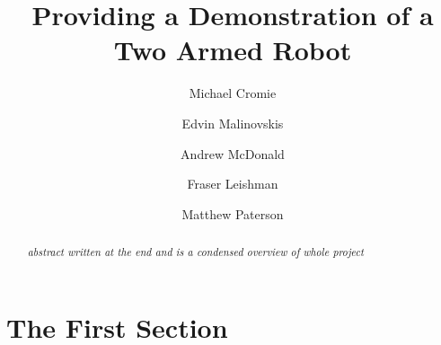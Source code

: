 \documentclass[preprint,12pt]{elsarticle}
\begin{document}
\begin{frontmatter}


\title{Providing a Demonstration of a Two Armed Robot}


\author{Michael Cromie}
\author{Edvin Malinovskis}
\author{Andrew McDonald}
\author{Fraser Leishman}
\author{Matthew Paterson}



\address{University of Glasgow}

\begin{abstract}
\textit{abstract written at the end and is a condensed overview of whole project}
\end{abstract}



\end{frontmatter}


\section{The First Section}
\label{S:1}
\end{document}

